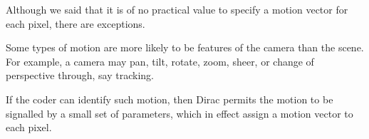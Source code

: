 Although we said that it is of no practical value to specify a motion
vector for each pixel, there are exceptions.

Some types of motion are more likely to be features of the camera than
the scene. For example, a camera may pan, tilt, rotate, zoom, sheer, or
change of perspective through, say tracking.

If the coder can identify such motion, then Dirac permits the motion to
be signalled by a small set of parameters, which in effect assign a
motion vector to each pixel.
